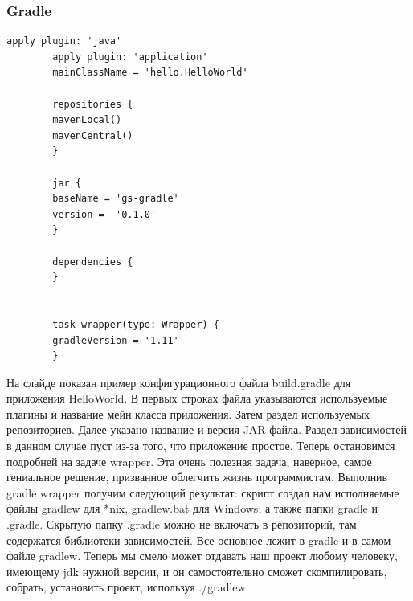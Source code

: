 \documentclass{../industrial-development}
\begin{document}
\begin{frame}[fragile] \frametitle{Gradle}
	\begin{lstlisting}[label=some-code,caption=build.gradle]
		apply plugin: 'java'
		apply plugin: 'application'
		mainClassName = 'hello.HelloWorld'

		repositories {
		mavenLocal()
		mavenCentral()
		}

		jar {
		baseName = 'gs-gradle'
		version =  '0.1.0'
		}

		dependencies {
		}
		

		task wrapper(type: Wrapper) {
		gradleVersion = '1.11'
		}
	\end{lstlisting}
\end{frame}
\lecturenotes
На слайде показан пример конфигурационного файла build.gradle для приложения HelloWorld.
В первых строках файла указываются используемые плагины и название мейн класса приложения. Затем раздел используемых репозиториев. Далее указано название и версия JAR-файла. Раздел зависимостей в данном случае пуст из-за того, что приложение простое.
Теперь остановимся подробней на задаче wrapper. Эта очень полезная задача, наверное, самое гениальное решение, призванное облегчить жизнь программистам. Выполнив 
gradle wrapper 
получим следующий результат: скрипт создал нам исполняемые файлы gradlew для *nix, gradlew.bat для Windows, а также папки gradle и .gradle. Скрытую папку .gradle можно не включать в репозиторий, там содержатся библиотеки зависимостей. Все основное лежит в gradle и в самом файле gradlew. Теперь мы смело может отдавать наш проект любому человеку, имеющему jdk нужной версии, и он самостоятельно сможет скомпилировать, собрать, установить проект, используя ./gradlew. 
~\cite{Habr_Gradle}
~\cite{Yandex_Build_Automation}
\end{document}
